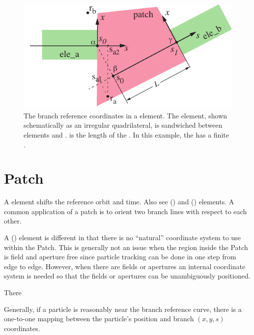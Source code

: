 \begin{figure}[bt]
  \centering
  \includegraphics[width=5in]{patch-problem.pdf}
  \caption[The branch reference coordinates in a  element.]
{The branch reference coordinates in a  element. The  element, shown
schematically as an irregular quadrilateral, is sandwiched between elements  and
.  is the length of the . In this example, the  has a finite
.}
  \label{f:patch.prob}
\end{figure}

\section{Patch}
\label{s:patch}

A  element shifts the reference orbit and time. Also see 
() and  () elements. A common application of a patch
is to orient two branch lines with respect to each other. 


A  () element is different in that there is no ``natural'' coordinate 
system to use within the Patch. This is generally not an issue when the region inside the
Patch is field and aperture free since particle tracking can be done in one step from edge
to edge. However, when there are fields or apertures an internal
coordinate system is needed so that the fields or apertures can be unambiguously positioned.



There 


Generally, if a particle is reasonably near the branch reference curve, there is a one-to-one mapping
between the particle's position and branch $(x, y, s)$ coordinates. 


